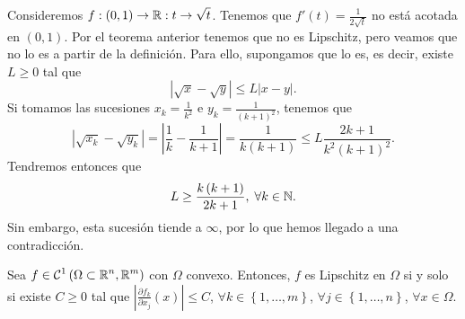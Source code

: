 \begin{eg}
Consideremos $\displaystyle f : \left(0,1\right)\to \mathbb{R} : t \to \sqrt{t} $. Tenemos que $\displaystyle f'\left(t\right)=\frac{1}{2\sqrt{t}} $ no está acotada en $\displaystyle \left(0,1\right) $. Por el teorema anterior tenemos que no es Lipschitz, pero veamos que no lo es a partir de la definición. Para ello, supongamos que lo es, es decir, existe $\displaystyle L \geq 0$ tal que 
\[ \left|\sqrt{x}-\sqrt{y}\right|\leq L \left|x-y\right| .\]
Si tomamos las sucesiones $\displaystyle x_{k}=\frac{1}{k^{2}} $ e $\displaystyle y_{k}=\frac{1}{\left(k + 1\right)^{2}} $, tenemos que 
\[ \left|\sqrt{x_{k}}-\sqrt{y_{k}}\right| = \left|\frac{1}{k}-\frac{1}{k + 1}\right|=\frac{1}{k\left(k+1\right)}\leq L\frac{2k+1}{k^{2}\left(k+1\right)^{2}} .\]
Tendremos entonces que 
\[L \geq \frac{k\left(k + 1\right)}{2k+1}, \; \forall k \in \mathbb{N} .\]
Sin embargo, esta sucesión tiende a $\displaystyle \infty $, por lo que hemos llegado a una contradicción. 
\end{eg}
\begin{prop}
	Sea $\displaystyle f\in \mathcal{C}^{1}\left(\Omega\subset \mathbb{R}^{n}, \mathbb{R}^{m}\right) $ con $\displaystyle \Omega  $ convexo. Entonces, $\displaystyle f $ es Lipschitz en $\displaystyle \Omega  $ si y solo si existe $\displaystyle C \geq 0 $ tal que $\displaystyle \left|\frac{\partial f_{k}}{\partial x_{j}}\left(x\right)\right| \leq C $, $\displaystyle \forall k \in \left\{ 1, \ldots, m\right\}  $, $\displaystyle \forall j \in \left\{ 1, \ldots, n\right\}  $, $\displaystyle \forall x \in \Omega  $. 
\end{prop}
